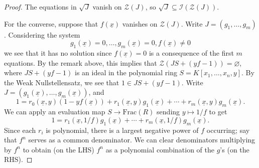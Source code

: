 \documentclass{amsart}[12pt]
\newcommand{\vx}{\underline{x}}
\newcommand{\cZ}{\mathcal{Z}}
\newcommand{\cI}{\mathcal{I}}
\numberwithin{equation}{section}
\theoremstyle{plain} %
\theoremstyle{definition}
\theoremstyle{remark}
\begin{document}
\begin{proof}
The equations in $\sqrt{J}$ vanish on $\cZ(J)$, so $\sqrt{J}\subseteq \cI(\cZ(J))$.
	
	For the converse, suppose that $f(\vx)$ vanishes on $\cZ(J)$. Write $J=(g_1,\dots,g_m)$. Considering the system 
\[
g_1(\vx)=0, \dots, g_m(\vx)=0, f(\vx)\neq 0
\]
we see that it has no solution since $f(\vx)=0$ is a consequence of the first $m$ equations. By the remark above, 
this implies that $\cZ(JS+(yf-1))=\varnothing$, where $JS+(yf-1)$ is an ideal in the polynomial ring ${S=K[x_1,\ldots,x_n,y]}$. By the Weak Nullstellensatz, we see that $1\in J S+(yf-1)$. Write $J=(g_1(\vx),\dots,g_m(\vx))$, and
	\[1 = r_0(\vx,y) (1-yf(\vx))+r_1(\vx,y) g_1(\vx) + \cdots + r_m(\vx,y) g_m(\vx).  \]
	We can apply an evaluation map $S\to \mathrm{Frac}(R)$ sending $y \mapsto 1/f$ to get
	\[1 = r_1(\vx,1/f) g_1(\vx) + \cdots + r_m(\vx,1/f) g_m(\vx).  \]
	 Since each $r_i$ is polynomial, there is a largest negative power of $f$ occurring; say that $f^n$ serves as a common denominator. We can clear denominators multiplying by $f^n$ to obtain (on the LHS) $f^n$ as a polynomial combination of the $g$'s (on the RHS).
\end{proof}
\end{document}
